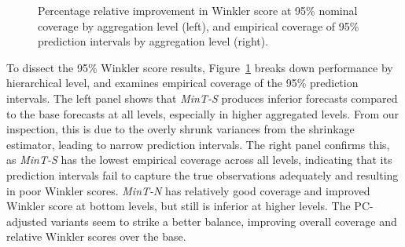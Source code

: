 \documentclass[
  11pt,
  letterpaper,
  DIV=11,
  numbers=noendperiod,
  titlepage]{scrartcl}
\begin{document}
\begin{figure}


\caption{\label{fig-tourism-coverage-95-level}Percentage relative
improvement in Winkler score at 95\% nominal coverage by aggregation
level (left), and empirical coverage of 95\% prediction intervals by
aggregation level (right).}

\end{figure}%

To dissect the 95\% Winkler score results,
Figure~\ref{fig-tourism-coverage-95-level} breaks down performance by
hierarchical level, and examines empirical coverage of the 95\%
prediction intervals. The left panel shows that \emph{MinT-S} produces
inferior forecasts compared to the base forecasts at all levels,
especially in higher aggregated levels. From our inspection, this is due
to the overly shrunk variances from the shrinkage estimator, leading to
narrow prediction intervals. The right panel confirms this, as
\emph{MinT-S} has the lowest empirical coverage across all levels,
indicating that its prediction intervals fail to capture the true
observations adequately and resulting in poor Winkler scores.
\emph{MinT-N} has relatively good coverage and improved Winkler score at
bottom levels, but still is inferior at higher levels. The PC-adjusted
variants seem to strike a better balance, improving overall coverage and
relative Winkler scores over the base.
\end{document}
